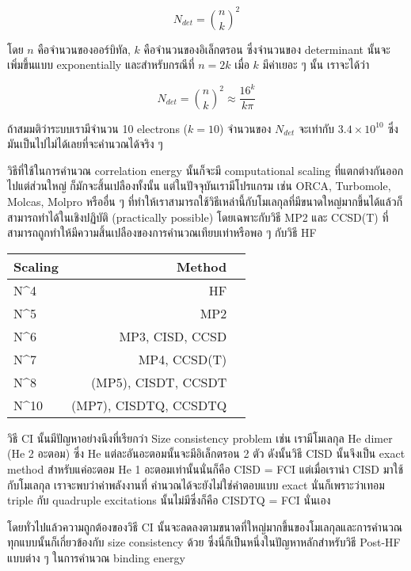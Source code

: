 \begin{equation}
    N_{det} = \binom{n}{k}^{2}
\end{equation}

\noindent โดย $n$ คือจำนวนของออร์บิทัล, $k$ คือจำนวนของอิเล็กตรอน ซึ่งจำนวนของ determinant 
นั้นจะเพิ่มขึ้นแบบ exponentially และสำหรับกรณีที่ $n = 2k$ เมื่อ $k$ มีค่าเยอะ ๆ นั้น เราจะได้ว่า 

\begin{equation}
    N_{det} = \binom{n}{k}^{2} \approx \frac{16^k}{k\pi}
\end{equation}

ถ้าสมมติว่าระบบเรามีจำนวน 10 electrons ($k = 10$) จำนวนของ $N_{det}$ จะเท่ากับ $3.4 \times 10^{10}$ 
ซึ่งมันเป็นไปไม่ได้เลยที่จะคำนวณได้จริง ๆ

วิธีที่ใช้ในการคำนวณ correlation energy นั้นก็จะมี computational scaling ที่แตกต่างกันออกไปแต่ส่วนใหญ่%
ก็มักจะสิ้นเปลืองทั้งนั้น แต่ในปัจจุบันเรามีโปรแกรม เช่น ORCA, Turbomole, Molcas, Molpro หรืออื่น ๆ 
ที่ทำให้เราสามารถใช้วิธีเหล่านี้กับโมเลกุลที่มีขนาดใหญ่มากขึ้นได้แล้วก็สามารถทำได้ในเชิงปฏิบัติ (practically possible)
โดยเฉพาะกับวิธี MP2 และ CCSD(T) ที่สามารถถูกทำให้มีความสิ้นเปลืองของการคำนวณเทียบเท่าหรือพอ ๆ กับวิธี HF 

\begin{table}[!htp]
    \Large
    \centering
    \begin{tabular}{lrr}\toprule
    Scaling &Method \\\midrule
    N^4 &HF \\
    N^5 &MP2 \\
    N^6 &MP3, CISD, CCSD \\
    N^7 &MP4, CCSD(T) \\
    N^8 &(MP5), CISDT, CCSDT \\
    N^{10} &(MP7), CISDTQ, CCSDTQ \\
    \bottomrule
    \end{tabular}
\end{table}

วิธี CI นั้นมีปัญหาอย่างนึงที่เรียกว่า Size consistency problem เช่น เรามีโมเลกุล He dimer (He 2 อะตอม) 
ซึ่ง He แต่ละอันอะตอมนั้นจะมีอิเล็กตรอน 2 ตัว ดังนั้นวิธี CISD นั้นจึงเป็น exact method สำหรับแค่อะตอม He 1 
อะตอมเท่านั้นนั่นก็คือ CISD = FCI แต่เมื่อเรานำ CISD มาใช้กับโมเลกุล  เราจะพบว่าค่าพลังงานที่%
คำนวณได้จะยังไม่ใช่คำตอบแบบ exact นั่นก็เพราะว่าเทอม triple กับ quadruple excitations นั้นไม่มีซึ่งก็คือ
CISDTQ = FCI นั่นเอง 

โดยทั่วไปแล้วความถูกต้องของวิธี CI นั้นจะลดลงตามขนาดที่ใหญ่มากขึ้นของโมเลกุลและการคำนวณทุกแบบนั้นก็เกี่ยวข้องกับ 
size consistency ด้วย ซึ่งนี่ก็เป็นหนึ่งในปัญหาหลักสำหรับวิธี Post-HF แบบต่าง ๆ ในการคำนวณ binding energy 

